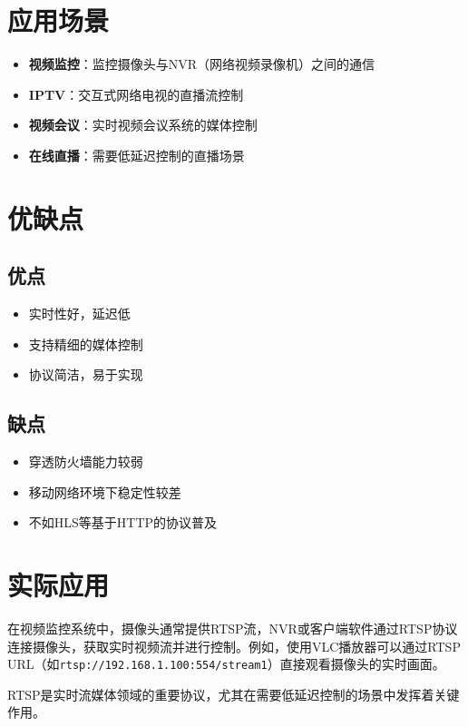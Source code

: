 \documentclass[12pt,UTF8]{ctexbook}
\begin{document}
\chapter{应用场景}

\begin{itemize}
  \item \textbf{视频监控}：监控摄像头与NVR（网络视频录像机）之间的通信
  \item \textbf{IPTV}：交互式网络电视的直播流控制
  \item \textbf{视频会议}：实时视频会议系统的媒体控制
  \item \textbf{在线直播}：需要低延迟控制的直播场景
\end{itemize}

\chapter{优缺点}

\section{优点}

\begin{itemize}
  \item 实时性好，延迟低
  \item 支持精细的媒体控制
  \item 协议简洁，易于实现
\end{itemize}

\section{缺点}

\begin{itemize}
  \item 穿透防火墙能力较弱
  \item 移动网络环境下稳定性较差
  \item 不如HLS等基于HTTP的协议普及
\end{itemize}

\chapter{实际应用}

在视频监控系统中，摄像头通常提供RTSP流，NVR或客户端软件通过RTSP协议连接摄像头，获取实时视频流并进行控制。例如，使用VLC播放器可以通过RTSP URL（如\verb|rtsp://192.168.1.100:554/stream1|）直接观看摄像头的实时画面。

RTSP是实时流媒体领域的重要协议，尤其在需要低延迟控制的场景中发挥着关键作用。

\backmatter
\end{document}
